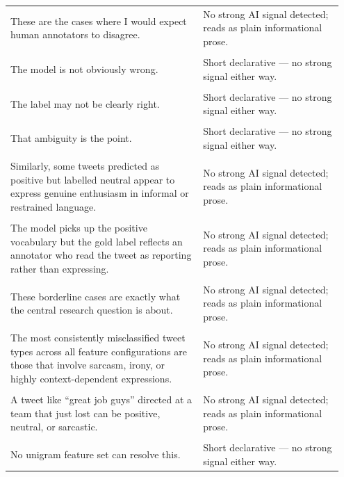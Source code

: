 \documentclass[11pt]{article}
\begin{document}
\begin{longtable}{|p{0.55\linewidth}|p{0.40\linewidth}|}
\hline
\rule{0pt}{3.5cm} & \\
\hline
These are the cases where I would expect human annotators to disagree. & No strong AI signal detected; reads as plain informational prose. \\[2pt]
\hline
\rule{0pt}{3.5cm} & \\
\hline
The model is not obviously wrong. & Short declarative --- no strong signal either way. \\[2pt]
\hline
\rule{0pt}{3.5cm} & \\
\hline
The label may not be clearly right. & Short declarative --- no strong signal either way. \\[2pt]
\hline
\rule{0pt}{3.5cm} & \\
\hline
That ambiguity is the point. & Short declarative --- no strong signal either way. \\[2pt]
\hline
\rule{0pt}{3.5cm} & \\
\hline
Similarly, some tweets predicted as positive but labelled neutral appear to express genuine enthusiasm in informal or restrained language. & No strong AI signal detected; reads as plain informational prose. \\[2pt]
\hline
\rule{0pt}{3.5cm} & \\
\hline
The model picks up the positive vocabulary but the gold label reflects an annotator who read the tweet as reporting rather than expressing. & No strong AI signal detected; reads as plain informational prose. \\[2pt]
\hline
\rule{0pt}{3.5cm} & \\
\hline
These borderline cases are exactly what the central research question is about. & No strong AI signal detected; reads as plain informational prose. \\[2pt]
\hline
\rule{0pt}{3.5cm} & \\
\hline
The most consistently misclassified tweet types across all feature configurations are those that involve sarcasm, irony, or highly context-dependent expressions. & No strong AI signal detected; reads as plain informational prose. \\[2pt]
\hline
\rule{0pt}{3.5cm} & \\
\hline
A tweet like ``great job guys'' directed at a team that just lost can be positive, neutral, or sarcastic. & No strong AI signal detected; reads as plain informational prose. \\[2pt]
\hline
\rule{0pt}{3.5cm} & \\
\hline
No unigram feature set can resolve this. & Short declarative --- no strong signal either way. \\[2pt]

\end{longtable}
\end{document}
